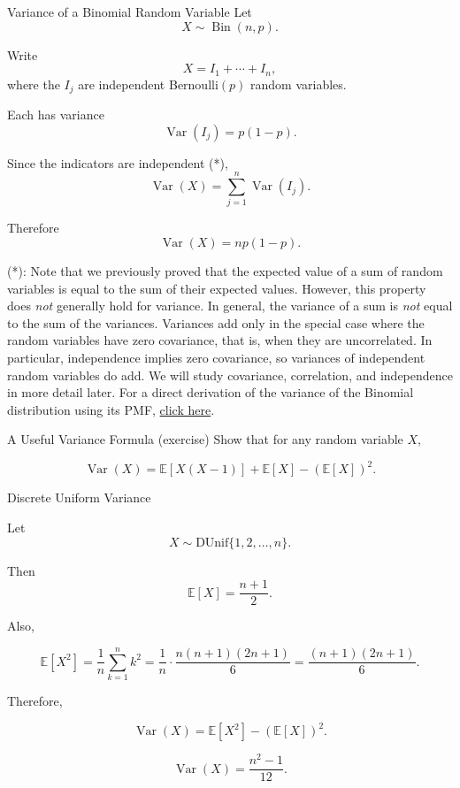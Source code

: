\begin{frame}{Variance of a Binomial Random Variable}
Let
\[
X\sim \operatorname{Bin}(n,p).
\]

Write
\[
X=I_1+\cdots+I_n,
\]
where the $I_j$ are independent Bernoulli$(p)$ random variables.

Each has variance
\[
\operatorname{Var}(I_j)=p(1-p).
\]

Since the indicators are independent (*),
\[
\operatorname{Var}(X)
=
\sum_{j=1}^n \operatorname{Var}(I_j).
\]

Therefore
\[
{
\operatorname{Var}(X)=np(1-p).
}
\]

(*): Note that we previously proved that the expected value of a sum of random variables
is equal to the sum of their expected values. However, this property does
\emph{not} generally hold for variance. In general, the variance of a sum is
\emph{not} equal to the sum of the variances. Variances add only in the special case where the random variables have zero
covariance, that is, when they are uncorrelated. In particular, independence implies zero covariance, so variances of independent random variables do add. We will study covariance, correlation, and independence in more detail later. For a direct derivation of the variance of the Binomial distribution using its
PMF, \href{https://proofwiki.org/wiki/Variance_of_Binomial_Distribution}{click here}.

\end{frame}



\begin{frame}{A Useful Variance Formula (exercise)}
Show that for any random variable $X$,

\[
\operatorname{Var}(X)=\mathbb{E}[X(X-1)]+\mathbb{E}[X]-(\mathbb{E}[X])^2.
\]

\end{frame}


\begin{frame}{Discrete Uniform Variance}

Let
\[
X\sim \text{DUnif}\{1,2,\dots,n\}.
\]

Then
\[
\mathbb{E}[X]=\frac{n+1}{2}.
\]

Also,

\[
\mathbb{E}[X^2]
=
\frac1n\sum_{k=1}^n k^2
=
\frac1n\cdot \frac{n(n+1)(2n+1)}{6}
=
\frac{(n+1)(2n+1)}{6}.
\]

Therefore,

\[
\operatorname{Var}(X)
=
\mathbb{E}[X^2]-(\mathbb{E}[X])^2.
\]

\[
{
\operatorname{Var}(X)=\frac{n^2-1}{12}.
}
\]

\end{frame}

